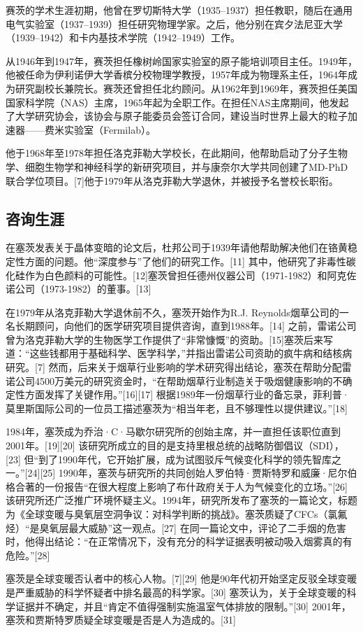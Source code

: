 赛茨的学术生涯初期，他曾在罗切斯特大学（1935–1937）担任教职，随后在通用电气实验室（1937–1939）担任研究物理学家。之后，他分别在宾夕法尼亚大学（1939–1942）和卡内基技术学院（1942–1949）工作。

从1946年到1947年，赛茨担任橡树岭国家实验室的原子能培训项目主任。1949年，他被任命为伊利诺伊大学香槟分校物理学教授，1957年成为物理系主任，1964年成为研究副校长兼院长。赛茨还曾担任北约顾问。从1962年到1969年，赛茨担任美国国家科学院（NAS）主席，1965年起为全职工作。在担任NAS主席期间，他发起了大学研究协会，该协会与原子能委员会签订合同，建设当时世界上最大的粒子加速器——费米实验室（Fermilab）。

他于1968年至1978年担任洛克菲勒大学校长，在此期间，他帮助启动了分子生物学、细胞生物学和神经科学的新研究项目，并与康奈尔大学共同创建了MD-PhD联合学位项目。[7]他于1979年从洛克菲勒大学退休，并被授予名誉校长职衔。
\subsection{咨询生涯}  
在塞茨发表关于晶体变暗的论文后，杜邦公司于1939年请他帮助解决他们在铬黄稳定性方面的问题。他“深度参与”了他们的研究工作。[11] 其中，他研究了非毒性碳化硅作为白色颜料的可能性。[12]塞茨曾担任德州仪器公司（1971-1982）和阿克佐诺公司（1973-1982）的董事。[13]

在1979年从洛克菲勒大学退休前不久，塞茨开始作为R.J. Reynolds烟草公司的一名长期顾问，向他们的医学研究项目提供咨询，直到1988年。[14] 之前，雷诺公司曾为洛克菲勒大学的生物医学工作提供了“非常慷慨”的资助。[15]塞茨后来写道：“这些钱都用于基础科学、医学科学，”并指出雷诺公司资助的疯牛病和结核病研究。[7] 然而，后来关于烟草行业影响的学术研究得出结论，塞茨在帮助分配雷诺公司4500万美元的研究资金时，“在帮助烟草行业制造关于吸烟健康影响的不确定性方面发挥了关键作用。”[16][17] 根据1989年一份烟草行业的备忘录，菲利普·莫里斯国际公司的一位员工描述塞茨为“相当年老，且不够理性以提供建议。”[18]

1984年，塞茨成为乔治·C·马歇尔研究所的创始主席，并一直担任该职位直到2001年。[19][20] 该研究所成立的目的是支持里根总统的战略防御倡议（SDI），[23] 但“到了1990年代，它开始扩展，成为试图驳斥气候变化科学的领先智库之一。”[24][25] 1990年，塞茨与研究所的共同创始人罗伯特·贾斯特罗和威廉·尼尔伯格合著的一份报告“在很大程度上影响了布什政府关于人为气候变化的立场。”[26] 该研究所还广泛推广环境怀疑主义。1994年，研究所发布了塞茨的一篇论文，标题为《全球变暖与臭氧层空洞争议：对科学判断的挑战》。塞茨质疑了CFCs（氯氟烃）“是臭氧层最大威胁”这一观点。[27] 在同一篇论文中，评论了二手烟的危害时，他得出结论：“在正常情况下，没有充分的科学证据表明被动吸入烟雾真的有危险。”[28]

塞茨是全球变暖否认者中的核心人物。[7][29] 他是90年代初开始坚定反驳全球变暖是严重威胁的科学怀疑者中排名最高的科学家。[30] 塞茨认为，关于全球变暖的科学证据并不确定，并且“肯定不值得强制实施温室气体排放的限制。”[30] 2001年，塞茨和贾斯特罗质疑全球变暖是否是人为造成的。[31]